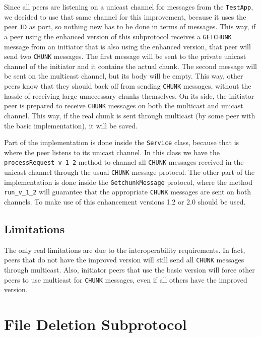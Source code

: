 \documentclass[11pt,a4paper,reqno]{report}
\numberwithin{equation}{section}
\begin{document}
Since all peers are listening on a unicast channel for messages from the \verb!TestApp!, we decided to use that same channel for this improvement, because it uses the peer \verb!ID! as port, so nothing new has to be done in terms of messages. This way, if a peer using the enhanced version of this subprotocol receives a \verb!GETCHUNK! message from an initiator that is also using the enhanced version, that peer will send two \verb!CHUNK! messages. The first message will be sent to the private unicast channel of the initiator and it contains the actual chunk. The second message will be sent on the multicast channel, but its body will be empty. This way, other peers know that they should back off from sending \verb!CHUNK! messages, without the hassle of receiving large unnecessary chunks themselves. On its side, the initiator peer is prepared to receive \verb!CHUNK! messages on both the multicast and unicast channel. This way, if the real chunk is sent through multicast (by some peer with the basic implementation), it will be saved.

Part of the implementation is done inside the \verb!Service! class, because that is where the peer listens to its unicast channel. In this class we have the \verb!processRequest_v_1_2! method to channel all \verb!CHUNK! messages received in the unicast channel through the usual \verb!CHUNK! message protocol. The other part of the implementation is done inside the \verb!GetchunkMessage! protocol, where the method \verb!run_v_1_2! will guarantee that the appropriate \verb!CHUNK! messages are sent on both channels. To make use of this enhancement versions 1.2 or 2.0 should be used.

\section{Limitations}

The only real limitations are due to the interoperability requirements. In fact, peers that do not have the improved version will still send all \verb!CHUNK! messages through multicast. Also, initiator peers that use the basic version will force other peers to use multicast for \verb!CHUNK! messages, even if all others have the improved version.



\chapter{File Deletion Subprotocol}
\end{document}
